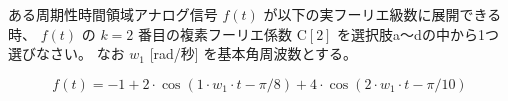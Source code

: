 ある周期性時間領域アナログ信号 $f(t)$ が以下の実フーリエ級数に展開できる時、
$f(t)$ の $k=2$ 番目の複素フーリエ係数 $\textrm{C}[2]$ を選択肢a〜dの中から1つ選びなさい。
なお $w_1$ [rad/秒] を基本角周波数とする。

\[
f(t) = 
-1
+ 2 \cdot \cos( 1 \cdot w_1 \cdot t - \pi/8 )
+ 4 \cdot \cos( 2 \cdot w_1 \cdot t - \pi/10 )
\]
